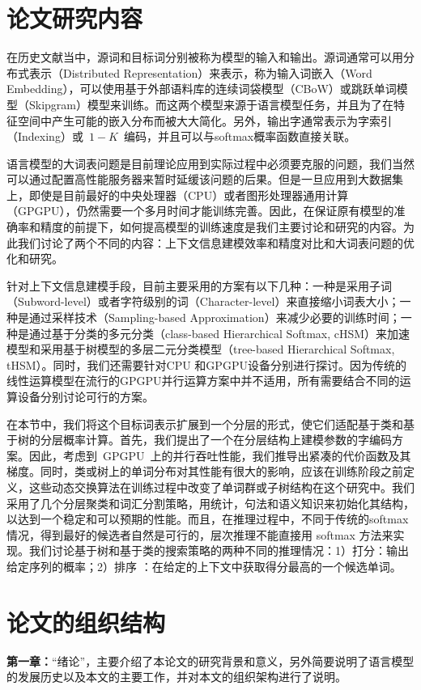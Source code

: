 \section{论文研究内容}
在历史文献当中，源词和目标词分别被称为模型的输入和输出。源词通常可以用分布式表示（Distributed Representation）来表示，称为输入词嵌入（Word Embedding），可以使用基于外部语料库的连续词袋模型（CBoW）或跳跃单词模型（Skipgram）模型来训练。而这两个模型来源于语言模型任务，并且为了在特征空间中产生可能的嵌入分布而被大大简化。另外，输出字通常表示为字索引（Indexing）或~$1-K$~编码，并且可以与softmax概率函数直接关联。

语言模型的大词表问题是目前理论应用到实际过程中必须要克服的问题，我们当然可以通过配置高性能服务器来暂时延缓该问题的后果。但是一旦应用到大数据集上，即使是目前最好的中央处理器（CPU）或者图形处理器通用计算（GPGPU），仍然需要一个多月时间才能训练完善。因此，在保证原有模型的准确率和精度的前提下，如何提高模型的训练速度是我们主要讨论和研究的内容。为此我们讨论了两个不同的内容：上下文信息建模效率和精度对比和大词表问题的优化和研究。

针对上下文信息建模手段，目前主要采用的方案有以下几种：一种是采用子词（Subword-level）或者字符级别的词（Character-level）来直接缩小词表大小；一种是通过采样技术（Sampling-based Approximation）来减少必要的训练时间；一种是通过基于分类的多元分类（class-based Hierarchical Softmax, cHSM）来加速模型和采用基于树模型的多层二元分类模型（tree-based Hierarchical Softmax, tHSM）。同时，我们还需要针对CPU 和GPGPU设备分别进行探讨。因为传统的线性运算模型在流行的GPGPU并行运算方案中并不适用，所有需要结合不同的运算设备分别讨论可行的方案。

在本节中，我们将这个目标词表示扩展到一个分层的形式，使它们适配基于类和基于树的分层概率计算。首先，我们提出了一个在分层结构上建模参数的字编码方案。因此，考虑到~GPGPU~上的并行吞吐性能，我们推导出紧凑的代价函数及其梯度。同时，类或树上的单词分布对其性能有很大的影响，应该在训练阶段之前定义，这些动态交换算法在训练过程中改变了单词群或子树结构在这个研究中。我们采用了几个分层聚类和词汇分割策略，用统计，句法和语义知识来初始化其结构，以达到一个稳定和可以预期的性能。而且，在推理过程中，不同于传统的softmax情况，得到最好的候选者自然是可行的，层次推理不能直接用 softmax 方法来实现。我们讨论基于树和基于类的搜索策略的两种不同的推理情况：1）打分：输出给定序列的概率；2）排序   ：在给定的上下文中获取得分最高的一个候选单词。
\section{论文的组织结构}
\textbf{第一章：}``绪论''，主要介绍了本论文的研究背景和意义，另外简要说明了语言模型的发展历史以及本文的主要工作，并对本文的组织架构进行了说明。

